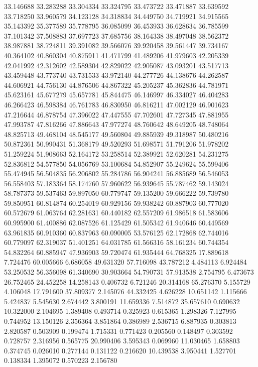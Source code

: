 33.146688
33.283288
33.304334
33.324795
33.473722
33.471887
33.639592
33.718250
33.960579
34.123128
34.318834
34.449750
34.719921
34.915565
35.143392
35.377589
35.778795
36.085099
36.453933
36.628634
36.785599
37.101342
37.508883
37.697723
37.685756
38.164338
38.497048
38.562372
38.987881
38.724811
39.391082
39.566076
39.920458
39.561447
39.734167
40.364102
40.860304
40.875911
41.471799
41.489206
41.979603
42.205339
42.041992
42.312602
42.589304
42.829022
42.905087
43.093201
43.517713
43.459448
43.773740
43.731533
43.972140
44.277726
44.138676
44.262587
44.606921
44.756130
44.876506
44.867322
45.205237
45.362836
44.781971
45.623161
45.677279
45.657781
45.844475
46.146997
46.334027
46.404283
46.266423
46.598384
46.761783
46.830950
46.816211
47.002129
46.901623
47.216644
46.878754
47.396022
47.447555
47.702601
47.727345
47.881955
47.993787
47.816266
47.886643
47.977274
48.760642
48.649205
48.748064
48.825713
49.468104
48.545177
49.560804
49.885939
49.318987
50.480216
50.872361
50.990431
51.368179
49.520293
51.698571
51.791206
51.978202
51.259224
51.908663
52.164172
53.258514
52.389921
52.620281
54.231275
52.836812
54.577850
54.056769
53.100684
54.852907
55.249624
55.599406
55.474945
56.504835
56.206802
55.284786
56.904241
56.885689
56.546053
56.558403
57.183364
58.174760
57.960622
56.939645
55.787462
59.143024
58.787373
59.537463
59.897050
60.779747
59.135200
59.666222
59.739780
59.850951
60.814874
60.254019
60.929156
59.938242
60.887903
60.777020
60.572679
61.063764
62.281631
60.440182
62.557209
61.986518
61.583606
60.995900
61.400886
62.087526
61.125429
61.505342
61.940646
60.449569
63.961835
60.910360
60.837963
60.090005
53.576125
62.172868
62.744016
60.779097
62.319037
51.401251
64.031785
61.566316
58.161234
60.744354
54.832264
60.885947
47.936903
59.720474
61.935444
64.768325
17.889618
7.724476
60.005666
6.686058
49.631320
57.716098
43.787212
4.484113
6.924484
53.250532
56.356098
61.340690
30.903664
54.790731
57.913538
2.754795
6.473673
26.752465
24.452258
14.258143
0.406732
6.721246
20.314168
65.276370
5.155729
4.106048
17.791600
37.809377
2.145076
44.332425
4.626228
10.651142
1.115666
5.424837
5.545630
2.674442
3.800191
11.659336
7.514872
35.657610
0.690632
10.322000
2.104695
1.389408
0.493714
0.325923
0.615365
1.298326
7.127995
0.744952
13.150126
2.356364
3.851864
0.386989
2.536715
6.887935
0.303813
2.820587
0.503909
0.199474
1.715331
0.771423
0.205560
0.148497
0.303592
0.728757
2.316956
0.565775
20.990406
3.595343
0.069960
11.030465
1.658803
0.374745
0.026010
0.277144
0.131122
0.216620
10.439538
3.950441
1.527701
0.138334
1.395072
0.570223
2.156780
